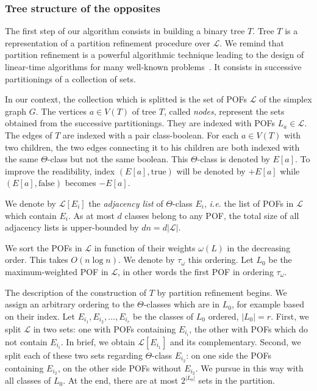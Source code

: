 \documentclass{article}
\newcommand{\card}[1]{\left| #1 \right|}
\begin{document}
\subsubsection{Tree structure of the opposites} \label{subsubsec:tree_opp}

The first step of our algorithm consists in building a binary tree $T$. Tree $T$ is a representation of a partition refinement procedure over $\mathcal{L}$. We remind that partition refinement is a powerful algorithmic technique leading to the design of linear-time algorithms for many well-known problems~\cite{HaPaVi99,PaTa87}. It consists in successive partitionings of a collection of sets.

In our context, the collection which is splitted is the set of POFs $\mathcal{L}$ of the simplex graph $G$. The vertices $a \in V(T)$ of tree $T$, called \textit{nodes}, represent the sets obtained from the successive partitionings. They are indexed with POFs $L_a \in \mathcal{L}$. The edges of $T$ are indexed with a pair class-boolean. For each $a \in V(T)$ with two children, the two edges connecting it to his children are both indexed with the same $\Theta$-class but not the same boolean. This $\Theta$-class is denoted by $E\left[a\right]$. To improve the readibility, index $(E\left[a\right],\mbox{true})$ will be denoted by $+E\left[a\right]$ while $(E\left[a\right],\mbox{false})$ becomes $-E\left[a\right]$.

We denote by $\mathcal{L}\left[E_i\right]$ the \textit{adjacency list} of $\Theta$-class $E_i$, {\em i.e.} the list of POFs in $\mathcal{L}$ which contain $E_i$. As at most $d$ classes belong to any POF, the total size of all adjacency lists is upper-bounded by $dn = d\card{\mathcal{L}}$.

We sort the POFs in $\mathcal{L}$ in function of their weights $\omega(L)$ in the decreasing order. This takes $O(n\log n)$. We denote by $\tau_{\omega}$ this ordering. Let $L_0$ be the maximum-weighted POF in $\mathcal{L}$, in other words the first POF in ordering $\tau_{\omega}$.

The description of the construction of $T$ by partition refinement begins. We assign an arbitrary ordering to the $\Theta$-classes which are in $L_0$, for example based on their index. Let $E_{i_1}, E_{i_2},\ldots, E_{i_r}$ be the classes of $L_0$ ordered, $\card{L_0} = r$. First, we split $\mathcal{L}$ in two sets: one with POFs containing $E_{i_i}$, the other with POFs which do not contain $E_{i_i}$. In brief, we obtain $\mathcal{L}\left[E_{i_1}\right]$ and its complementary. Second, we split each of these two sets regarding $\Theta$-class $E_{i_2}$: on one side the POFs containing $E_{i_2}$, on the other side POFs without $E_{i_2}$. We pursue in this way with all classes of $L_0$. At the end, there are at most $2^{\card{L_0}}$ sets in the partition.
\end{document}
